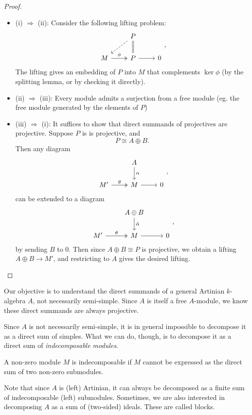 \documentclass[a4paper]{article}
\begin{document}
\begin{proof}\leavevmode
  \begin{itemize}
    \item (i) $\Rightarrow$ (ii): Consider the following lifting problem:
      \[
        \begin{tikzcd}
          & P \ar[d, equals] \ar[dl, dashed]\\
          M \ar[r, two heads, "\phi"] & P \ar[r] & 0
        \end{tikzcd},
      \]
      The lifting gives an embedding of $P$ into $M$ that complements $\ker \phi$ (by the splitting lemma, or by checking it directly).
    \item (ii) $\Rightarrow$ (iii): Every module admits a surjection from a free module (eg. the free module generated by the elements of $P$)
    \item (iii) $\Rightarrow$ (i): It suffices to show that direct summands of projectives are projective. Suppose $P$ is is projective, and
      \[
        P \cong A \oplus B.
      \]
      Then any diagram
      \[
        \begin{tikzcd}
          & A \ar[d, "\alpha"]\\
          M' \ar[r, two heads, "\theta"] & M \ar[r] & 0
        \end{tikzcd},
      \]
      can be extended to a diagram
      \[
        \begin{tikzcd}
          & A \oplus B \ar[d, "\tilde{\alpha}"]\\
          M' \ar[r, two heads, "\theta"] & M \ar[r] & 0
        \end{tikzcd},
      \]
      by sending $B$ to $0$. Then since $A \oplus B \cong P$ is projective, we obtain a lifting $A \oplus B \to M'$, and restricting to $A$ gives the desired lifting.
  \end{itemize}
\end{proof}

Our objective is to understand the direct summands of a general Artinian $k$-algebra $A$, not necessarily semi-simple. Since $A$ is itself a free $A$-module, we know these direct summands are always projective.

Since $A$ is not necessarily semi-simple, it is in general impossible to decompose it as a direct sum of simples. What we can do, though, is to decompose it as a direct sum of \emph{indecomposable modules}.

\begin{defi}[Indecomposable]
  A non-zero module $M$ is indecomposable if $M$ cannot be expressed as the direct sum of two non-zero submodules.
\end{defi}
Note that since $A$ is (left) Artinian, it can always be decomposed as a finite sum of indecomposable (left) submodules. Sometimes, we are also interested in decomposing $A$ as a sum of (two-sided) ideals. These are called blocks.
\end{document}
